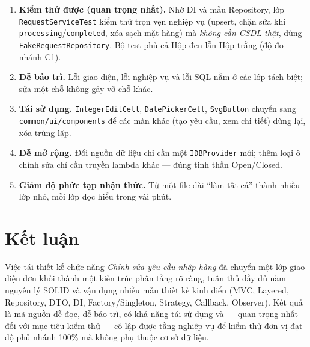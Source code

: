 \documentclass[12pt,a4paper]{article}
\begin{document}
\begin{enumerate}[leftmargin=*]
  \item \textbf{Kiểm thử được (quan trọng nhất).} Nhờ DI và mẫu Repository, lớp
        \texttt{RequestServiceTest} kiểm thử trọn vẹn nghiệp vụ (upsert, chặn sửa
        khi \texttt{processing}/\texttt{completed}, xóa sạch mặt hàng) mà
        \emph{không cần CSDL thật}, dùng \texttt{FakeRequestRepository}. Bộ test
        phủ cả Hộp đen lẫn Hộp trắng (độ đo nhánh C1).
  \item \textbf{Dễ bảo trì.} Lỗi giao diện, lỗi nghiệp vụ và lỗi SQL nằm ở các
        lớp tách biệt; sửa một chỗ không gây vỡ chỗ khác.
  \item \textbf{Tái sử dụng.} \texttt{IntegerEditCell}, \texttt{DatePickerCell},
        \texttt{SvgButton} chuyển sang \texttt{common/ui/components} để các màn
        khác (tạo yêu cầu, xem chi tiết) dùng lại, xóa trùng lặp.
  \item \textbf{Dễ mở rộng.} Đổi nguồn dữ liệu chỉ cần một \texttt{IDBProvider}
        mới; thêm loại ô chỉnh sửa chỉ cần truyền lambda khác --- đúng tinh thần
        Open/Closed.
  \item \textbf{Giảm độ phức tạp nhận thức.} Từ một file dài ``làm tất cả''
        thành nhiều lớp nhỏ, mỗi lớp đọc hiểu trong vài phút.
\end{enumerate}

\section{Kết luận}

Việc tái thiết kế chức năng \emph{Chỉnh sửa yêu cầu nhập hàng} đã chuyển một lớp
giao diện đơn khối thành một kiến trúc phân tầng rõ ràng, tuân thủ đầy đủ năm
nguyên lý SOLID và vận dụng nhiều mẫu thiết kế kinh điển (MVC, Layered,
Repository, DTO, DI, Factory/Singleton, Strategy, Callback, Observer). Kết quả
là mã nguồn dễ đọc, dễ bảo trì, có khả năng tái sử dụng và --- quan trọng nhất
đối với mục tiêu kiểm thử --- cô lập được tầng nghiệp vụ để kiểm thử đơn vị đạt
độ phủ nhánh 100\% mà không phụ thuộc cơ sở dữ liệu.
\end{document}
